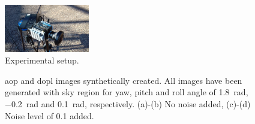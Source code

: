 \graphicspath{{./content/experiments/figures/}}

\begin{figure}
  \centering
\includegraphics[width=0.33\textwidth]{./content/experiments/figures/setup.jpg}
\caption{Experimental setup.}
\label{fig:setup}
\end{figure}

\begin{figure}
  \centering
  \hfill
  \hspace*{\fill}
  \hfill
  \hspace*{\fill}
  \caption{\gls{aop} and \gls{dopl} images synthetically created. All images
    have been generated with sky region for yaw, pitch and roll angle of
    \SI{1.8}{\radian}, \SI{-0.2}{\radian} and \SI{0.1}{\radian},
    respectively. (a)-(b) No noise added, (c)-(d) Noise level of 0.1 added.}
  \label{fig:aop-dop-syn}
\end{figure}

